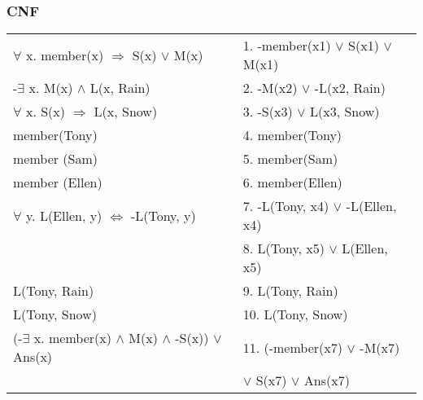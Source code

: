 \documentclass[compress, 9pt]{beamer}
\begin{document}
\begin{frame}
\frametitle{CNF}
\label{sec-4-3}

\hspace{0}

\begin{center}
\begin{tabular}{ll}
 $\forall$ x. member(x) $\Rightarrow$ S(x) $\vee$ M(x)                 &  1. -member(x1) $\vee$ S(x1) $\vee$ M(x1)  \\
 -$\exists$ x. M(x) $\wedge$ L(x, Rain)                                &  2. -M(x2) $\vee$ -L(x2, Rain)             \\
 $\forall$ x. S(x) $\Rightarrow$ L(x, Snow)                            &  3. -S(x3) $\vee$ L(x3, Snow)              \\
 member(Tony)                                                          &  4. member(Tony)                           \\
 member (Sam)                                                          &  5. member(Sam)                            \\
 member (Ellen)                                                        &  6. member(Ellen)                          \\
 $\forall$ y. L(Ellen, y) $\Leftrightarrow$ -L(Tony, y)                &  7. -L(Tony, x4) $\vee$ -L(Ellen, x4)      \\
                                                                       &  8. L(Tony, x5) $\vee$ L(Ellen, x5)        \\
 L(Tony, Rain)                                                         &  9. L(Tony, Rain)                          \\
 L(Tony, Snow)                                                         &  10. L(Tony, Snow)                         \\
 (-$\exists$ x. member(x) $\wedge$ M(x) $\wedge$ -S(x)) $\vee$ Ans(x)  &  11. (-member(x7) $\vee$ -M(x7)            \\
                                                                       &  $\vee$ S(x7) $\vee$ Ans(x7)               \\
\end{tabular}
\end{center}
\end{frame}
\end{document}
